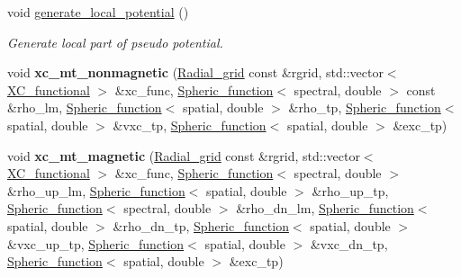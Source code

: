 \begin{DoxyCompactItemize}
void \hyperlink{classsirius_1_1_potential_ab4383d38a605d0b6367da339035e0130}{generate\+\_\+local\+\_\+potential} ()
\begin{DoxyCompactList}\small\item\em Generate local part of pseudo potential. \end{DoxyCompactList}\item 
\hypertarget{classsirius_1_1_potential_a7ca95ee1cfa05528bab436c0fdda5a34}{}void {\bfseries xc\+\_\+mt\+\_\+nonmagnetic} (\hyperlink{classsirius_1_1_radial__grid}{Radial\+\_\+grid} const \&rgrid, std\+::vector$<$ \hyperlink{classsirius_1_1_x_c__functional}{X\+C\+\_\+functional} $>$ \&xc\+\_\+func, \hyperlink{classsirius_1_1_spheric__function}{Spheric\+\_\+function}$<$ spectral, double $>$ const \&rho\+\_\+lm, \hyperlink{classsirius_1_1_spheric__function}{Spheric\+\_\+function}$<$ spatial, double $>$ \&rho\+\_\+tp, \hyperlink{classsirius_1_1_spheric__function}{Spheric\+\_\+function}$<$ spatial, double $>$ \&vxc\+\_\+tp, \hyperlink{classsirius_1_1_spheric__function}{Spheric\+\_\+function}$<$ spatial, double $>$ \&exc\+\_\+tp)\label{classsirius_1_1_potential_a7ca95ee1cfa05528bab436c0fdda5a34}

\item 
\hypertarget{classsirius_1_1_potential_ad2e7e5c77b137dc93c47787c4b6c36a3}{}void {\bfseries xc\+\_\+mt\+\_\+magnetic} (\hyperlink{classsirius_1_1_radial__grid}{Radial\+\_\+grid} const \&rgrid, std\+::vector$<$ \hyperlink{classsirius_1_1_x_c__functional}{X\+C\+\_\+functional} $>$ \&xc\+\_\+func, \hyperlink{classsirius_1_1_spheric__function}{Spheric\+\_\+function}$<$ spectral, double $>$ \&rho\+\_\+up\+\_\+lm, \hyperlink{classsirius_1_1_spheric__function}{Spheric\+\_\+function}$<$ spatial, double $>$ \&rho\+\_\+up\+\_\+tp, \hyperlink{classsirius_1_1_spheric__function}{Spheric\+\_\+function}$<$ spectral, double $>$ \&rho\+\_\+dn\+\_\+lm, \hyperlink{classsirius_1_1_spheric__function}{Spheric\+\_\+function}$<$ spatial, double $>$ \&rho\+\_\+dn\+\_\+tp, \hyperlink{classsirius_1_1_spheric__function}{Spheric\+\_\+function}$<$ spatial, double $>$ \&vxc\+\_\+up\+\_\+tp, \hyperlink{classsirius_1_1_spheric__function}{Spheric\+\_\+function}$<$ spatial, double $>$ \&vxc\+\_\+dn\+\_\+tp, \hyperlink{classsirius_1_1_spheric__function}{Spheric\+\_\+function}$<$ spatial, double $>$ \&exc\+\_\+tp)\label{classsirius_1_1_potential_ad2e7e5c77b137dc93c47787c4b6c36a3}


\end{DoxyCompactItemize}
